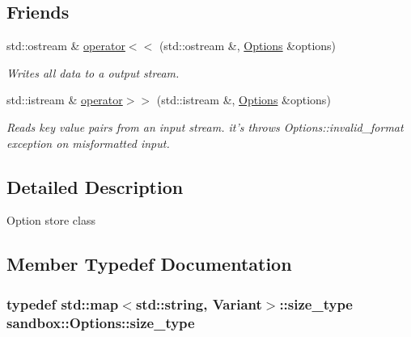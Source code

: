 \subsection*{Friends}
\begin{DoxyCompactItemize}
\item 
std\-::ostream \& \hyperlink{classsandbox_1_1_options_a48262220add64396ff9a3815815b6db2}{operator$<$$<$} (std\-::ostream \&, \hyperlink{classsandbox_1_1_options}{Options} \&options)
\begin{DoxyCompactList}\small\item\em Writes all data to a output stream. \end{DoxyCompactList}\item 
std\-::istream \& \hyperlink{classsandbox_1_1_options_a5ee987becff115c5d31195e8cbcd018e}{operator$>$$>$} (std\-::istream \&, \hyperlink{classsandbox_1_1_options}{Options} \&options)
\begin{DoxyCompactList}\small\item\em Reads key value pairs from an input stream. it's throws Options\-::invalid\-\_\-format exception on misformatted input. \end{DoxyCompactList}\end{DoxyCompactItemize}


\subsection{Detailed Description}
Option store class 

\subsection{Member Typedef Documentation}
\hypertarget{classsandbox_1_1_options_a9198beb778c2c79387c07e658513f67e}{
\subsubsection[{size\-\_\-type}]{\setlength{\rightskip}{0pt plus 5cm}typedef std\-::map$<$std\-::string, {\bf Variant}$>$\-::{\bf size\-\_\-type} {\bf sandbox\-::\-Options\-::size\-\_\-type}}}\label{classsandbox_1_1_options_a9198beb778c2c79387c07e658513f67e}


